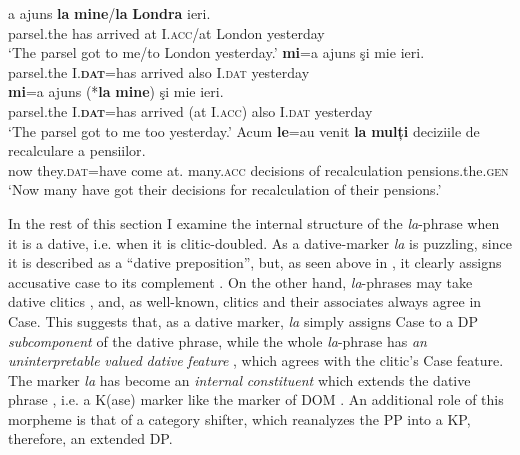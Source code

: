 \documentclass[output=paper,modfonts,nonflat,newtxmath]{langsci/langscibook}
\begin{document}
\ea%
      \label{ex:cornilescu:11}
         \ea \label{ex:cornilescu:11a}
          {a} {ajuns} \textbf{{la}} \textbf{mine}/\textbf{la} \textbf{{Londra}} {ieri}.	\\
         	 parsel.the has arrived at I.\textsc{acc}/at London yesterday\\
         \glt ‘The parsel got to me/to London yesterday.’
         \ex \label{ex:cornilescu:11b}
          \textbf{{mi}}{=a} {ajuns} {şi} {mie} {ieri.}	\\
         	parsel.the I.\textbf{\textsc{dat}}=has arrived also I.\textsc{dat} yesterday\\
         \ex \label{ex:cornilescu:11c}
          \textbf{{mi}}{=a} {ajuns} (*\textbf{la} \textbf{mine}) {şi} {mie} {ieri}.	\\
         parsel.the I.\textbf{\textsc{dat}}=has arrived (at I.\textsc{acc}) also I.\textsc{dat} yesterday\\
         \glt ‘The parsel got to me too yesterday.’
         \ex \label{ex:cornilescu:11d}
         \gll Acum \textbf{{le}}{=au} {venit} \textbf{{la}} \textbf{{mulți}} {deciziile} {de} {recalculare} {a pensiilor}.\\
         	now they.\textsc{dat}=have come at. many.\textsc{acc} decisions of  recalculation pensions.the.\textsc{gen}\\
         \glt ‘Now many have got their decisions for recalculation of their pensions.’
         \z 
         \z

In the rest of this section I examine the internal structure of the \textit{la}{}-phrase when it is a dative, i.e. when it is clitic-doubled. As a dative-marker \textit{la} is puzzling, since it is described as a “dative preposition”, but, as seen above in , it clearly assigns accusative case to its complement . On the other hand, \textit{la}{}-phrases may take dative clitics , and, as well-known, clitics and their associates always agree in Case. This suggests that, as a dative marker, \textit{la} simply assigns Case to a DP \textit{subcomponent} of the dative phrase, while the whole \textit{la}{}-phrase has \textit{an} \textit{uninterpretable} \textit{valued} \textit{dative} \textit{feature} , which agrees with the clitic’s Case feature. The marker \textit{la} has become an \textit{internal} \textit{constituent} which extends the dative phrase , i.e. a K(ase) marker like the marker of DOM \citep{López2011}. An additional role of this morpheme is that of a category shifter, which reanalyzes the PP into a KP, therefore, an extended DP.
\end{document}
